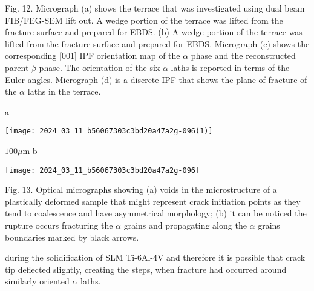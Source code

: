 \documentclass[10pt]{article}
\begin{document}
Fig. 12. Micrograph (a) shows the terrace that was investigated using dual beam FIB/FEG-SEM lift out. A wedge portion of the terrace was lifted from the fracture surface and prepared for EBDS. (b) A wedge portion of the terrace was lifted from the fracture surface and prepared for EBDS. Micrograph (c) shows the corresponding [001] IPF orientation map of the $\alpha$ phase and the reconstructed parent $\beta$ phase. The orientation of the six $\alpha$ laths is reported in terms of the Euler angles. Micrograph (d) is a discrete IPF that shows the plane of fracture of the $\alpha$ laths in the terrace.

a

\begin{center}
\texttt{[image: 2024\_03\_11\_b56067303c3bd20a47a2g-096(1)]}
\end{center}

$100 \mu \mathrm{m}$ b

\begin{center}
\texttt{[image: 2024\_03\_11\_b56067303c3bd20a47a2g-096]}
\end{center}

Fig. 13. Optical micrographs showing (a) voids in the microstructure of a plastically deformed sample that might represent crack initiation points as they tend to coalescence and have asymmetrical morphology; (b) it can be noticed the rupture occurs fracturing the $\alpha$ grains and propagating along the $\alpha$ grains boundaries marked by black arrows.

during the solidification of SLM Ti-6Al-4V and therefore it is possible that crack tip deflected slightly, creating the steps, when fracture had occurred around similarly oriented $\alpha$ laths.
\end{document}
